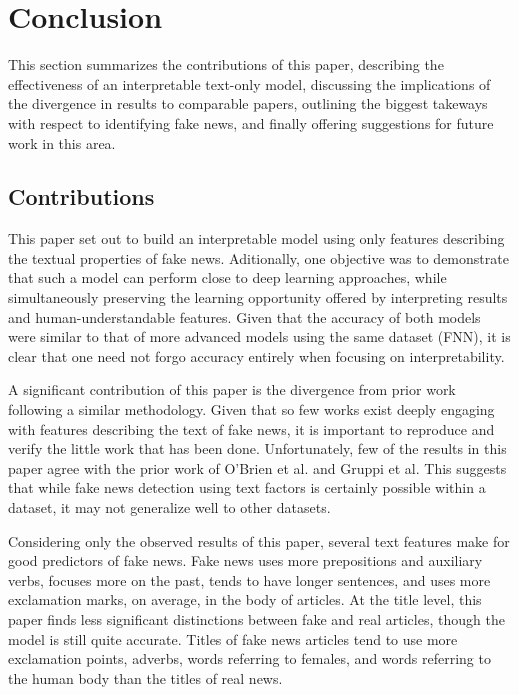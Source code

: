 \documentclass[../thesis.tex]{subfiles}
\begin{document}
\chapter{Conclusion}

This section summarizes the contributions of this paper, describing the effectiveness of an interpretable text-only model, discussing the implications of the divergence in results to comparable papers, outlining the biggest takeways with respect to identifying fake news, and finally offering suggestions for future work in this area.

\section{Contributions}

This paper set out to build an interpretable model using only features describing the textual properties of fake news. Aditionally, one objective was to demonstrate that such a model can perform close to deep learning approaches, while simultaneously preserving the learning opportunity offered by interpreting results and human-understandable features. Given that the accuracy of both models were similar to that of more advanced models using the same dataset (FNN), it is clear that one need not forgo accuracy entirely when focusing on interpretability.

A significant contribution of this paper is the divergence from prior work following a similar methodology. Given that so few works exist deeply engaging with features describing the text of fake news, it is important to reproduce and verify the little work that has been done. Unfortunately, few of the results in this paper agree with the prior work of O'Brien et al. and Gruppi et al. This suggests that while fake news detection using text factors is certainly possible within a dataset, it may not generalize well to other datasets. 

Considering only the observed results of this paper, several text features make for good predictors of fake news. Fake news uses more prepositions and auxiliary verbs, focuses more on the past, tends to have longer sentences, and uses more exclamation marks, on average, in the body of articles. At the title level, this paper finds less significant distinctions between fake and real articles,  though the model is still quite accurate. Titles of fake news articles tend to use more exclamation points, adverbs, words referring to females, and words referring to the human body than the titles of real news.
\end{document}
